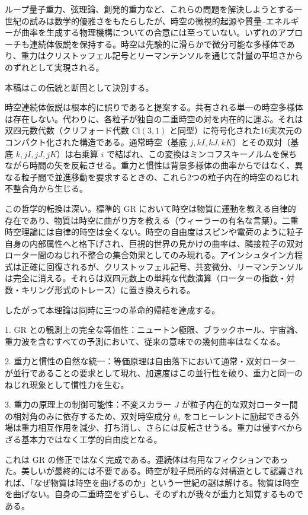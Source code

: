 \documentclass[dvipdfmx,a4paper]{article}
\begin{document}
ループ量子重力、弦理論、創発的重力など、これらの問題を解決しようとする一世紀の試みは数学的優雅さをもたらしたが、時空の微視的起源や質量--エネルギーが曲率を生成する物理機構についての合意には至っていない。いずれのアプローチも連続体仮説を保持する。時空は先験的に滑らかで微分可能な多様体であり、重力はクリストッフェル記号とリーマンテンソルを通じて計量の平坦さからのずれとして実現される。

本稿はこの伝統と断固として決別する。

時空連続体仮説は根本的に誤りであると提案する。共有される単一の時空多様体は存在しない。代わりに、各粒子が独自の二重時空の対を内在的に運ぶ。それは双四元数代数（クリフォード代数 $\mathrm{Cl}(3,1)$ と同型）に符号化された16実次元のコンパクト化された構造である。通常時空（基底 $j, kI, kJ, kK$）とその双対（基底 $k, jI, jJ, jK$）は右乗算 $i$ で結ばれ、この変換はミンコフスキーノルムを保ちながら時間の矢を反転させる。重力と慣性は背景多様体の曲率からではなく、異なる粒子間で並進移動を要求するときの、これら2つの粒子内在的時空のねじれ不整合角から生じる。

この哲学的転換は深い。標準的 GR において時空は物質に運動を教える自律的存在であり、物質は時空に曲がり方を教える（ウィーラーの有名な言葉）。二重時空理論には自律的時空は全くない。時空の自由度はスピンや電荷のように粒子自身の内部属性へと格下げされ、巨視的世界の見かけの曲率は、隣接粒子の双対ローター間のねじれ不整合の集合効果としてのみ現れる。アインシュタイン方程式は正確に回復されるが、クリストッフェル記号、共変微分、リーマンテンソルは完全に消える。それらは双四元数上の単純な代数演算（ローターの指数・対数・キリング形式のトレース）に置き換えられる。

したがって本理論は同時に三つの革命的帰結を達成する。

1. GR との観測上の完全な等価性：ニュートン極限、ブラックホール、宇宙論、重力波を含むすべての予測において、従来の意味での幾何曲率はなくなる。

2. 重力と慣性の自然な統一：等価原理は自由落下において通常・双対ローターが並行であることの要求として現れ、加速度はこの並行性を破り、重力と同一のねじれ現象として慣性力を生む。

3. 重力の原理上の制御可能性：不変スカラー $J$ が粒子内在的な双対ローター間の相対角のみに依存するため、双対時空成分 $\theta_a$ をコヒーレントに励起できる外場は重力相互作用を減少、打ち消し、さらには反転させうる。重力は侵すべからざる基本力ではなく工学的自由度となる。

これは GR の修正ではなく完成である。連続体は有用なフィクションであった。美しいが最終的には不要である。時空が粒子局所的な対構造として認識されれば、「なぜ物質は時空を曲げるのか」という一世紀の謎は解ける。物質は時空を曲げない。自身の二重時空をずらし、そのずれが我々が重力と知覚するものである。
\end{document}
